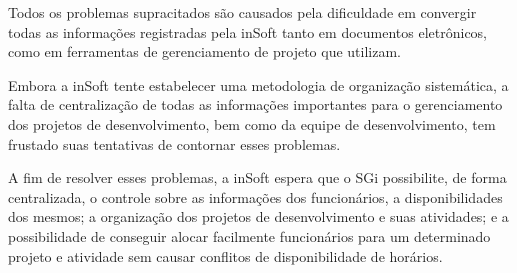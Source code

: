      Todos os problemas supracitados são causados pela dificuldade em convergir todas as informações registradas pela inSoft tanto em documentos eletrônicos, como em ferramentas de gerenciamento de projeto que utilizam.

      Embora a inSoft tente estabelecer uma metodologia de organização sistemática, a falta de centralização de todas as informações importantes para o gerenciamento dos projetos de desenvolvimento, bem como da equipe de desenvolvimento, tem frustado suas tentativas de contornar esses problemas.

      A fim de resolver esses problemas, a inSoft espera que o SGi possibilite, de forma centralizada, o controle sobre as informações dos funcionários, a disponibilidades dos mesmos; a organização dos projetos de desenvolvimento e suas atividades; e a possibilidade de conseguir alocar facilmente funcionários para um determinado projeto e atividade sem causar conflitos de disponibilidade de horários.

